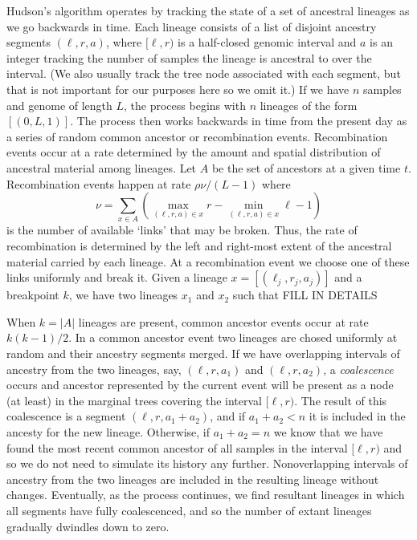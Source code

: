\documentclass{article}
\begin{document}
Hudson's algorithm operates by tracking the state of a set of ancestral
lineages as we go backwards in time. Each lineage consists of a list of
disjoint ancestry segments $(\ell, r, a)$, where
$[\ell, r)$ is a half-closed genomic interval and $a$ is an integer
tracking the number of samples the lineage is ancestral to over the interval.
(We also usually track the tree node associated with each segment, but
that is not important for our purposes here so we omit it.)
If we have $n$ samples and genome of length $L$, the process begins with $n$ lineages
of the form $[(0, L, 1)]$. The process then works backwards in time from
the present day as a series of random common ancestor or recombination events.
Recombination events occur at a rate determined by the amount and spatial
distribution of ancestral material among lineages.
Let $A$ be the set of ancestors at a given time $t$. Recombination events
happen at rate $\rho \nu / (L - 1)$ where
\[
\nu = \sum_{x \in A}\left( \max_{(\ell, r, a) \in x}r
    - \min_{(\ell, r, a) \in x}\ell - 1 \right)
\]
is the number of available `links' that may be broken. Thus, the rate of
recombination is determined by the left and right-most extent of the
ancestral material carried by each lineage. At a recombination
event we choose one of these links uniformly and break it. Given a lineage
$x = [(\ell_j, r_j, a_j)]$ and a breakpoint $k$, we have two lineages
$x_1$ and $x_2$ such that FILL IN DETAILS

When $k = |A|$ lineages are present, common ancestor events
occur at rate $k(k - 1) / 2$. In a common ancestor event two lineages
are chosed uniformly at random and their ancestry segments merged.
If we have overlapping intervals of ancestry from the two lineages,
say, $(\ell, r, a_1)$ and $(\ell, r, a_2)$, a
\emph{coalescence} occurs and ancestor represented by the current event
will be present as a node (at least) in the marginal trees covering
the interval $[\ell, r)$. The result of this coalescence is a segment
$(\ell, r, a_1 + a_2)$, and if $a_1 + a_2 < n$ it is included in the
ancesty for the new lineage. Otherwise, if $a_1 + a_2 = n$ we know that
we have found the most recent common ancestor of all samples in
the interval $[\ell, r)$ and so we do not need to simulate its history any further.
Nonoverlapping intervals of ancestry from the two lineages are included
in the resulting lineage without changes. Eventually, as the process continues,
we find resultant lineages in which all segments have fully coalescenced,
and so the number of extant lineages gradually dwindles down to zero.
\end{document}
